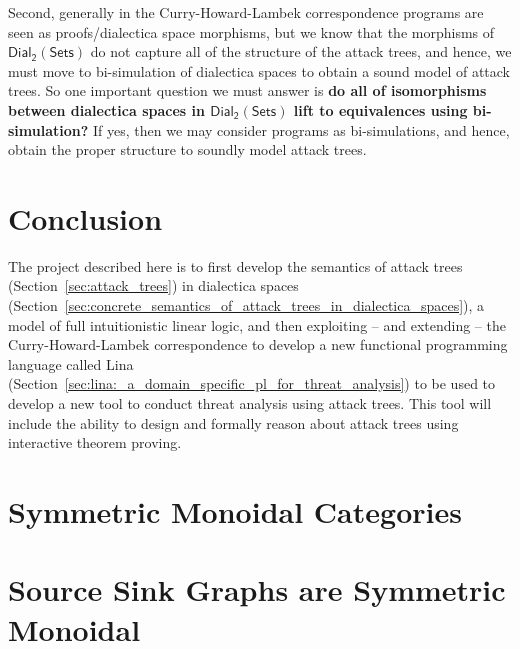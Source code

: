 \documentclass{llncs}
\newcommand{\dial}[0]{\mathsf{Dial_2}(\mathsf{Sets})}
\begin{document}
Second, generally in the Curry-Howard-Lambek correspondence programs
are seen as proofs/dialectica space morphisms, but we know that the
morphisms of $\dial$ do not capture all of the structure of the attack
trees, and hence, we must move to bi-simulation of dialectica spaces
to obtain a sound model of attack trees.  So one important question we
must answer is \textbf{do all of isomorphisms between dialectica
  spaces in $\dial$ lift to equivalences using bi-simulation?}  If
yes, then we may consider programs as bi-simulations, and hence,
obtain the proper structure to soundly model attack trees.

\section{Conclusion}
\label{sec:conclusion}
The project described here is to first develop the semantics of attack
trees (Section~\ref{sec:attack_trees}) in dialectica spaces
(Section~\ref{sec:concrete_semantics_of_attack_trees_in_dialectica_spaces}),
a model of full intuitionistic linear logic, and then exploiting --
and extending -- the Curry-Howard-Lambek correspondence to develop a
new functional programming language called Lina
(Section~\ref{sec:lina:_a_domain_specific_pl_for_threat_analysis}) to
be used to develop a new tool to conduct threat analysis using attack
trees.  This tool will include the ability to design and formally
reason about attack trees using interactive theorem proving.


 

\appendix

\section{Symmetric Monoidal Categories}
\label{sec:symmetric_monoidal_categories}


\section{Source Sink Graphs are Symmetric Monoidal}
\label{sec:source_sink_graphs_are_symmetric_monoidal}

\end{document}
